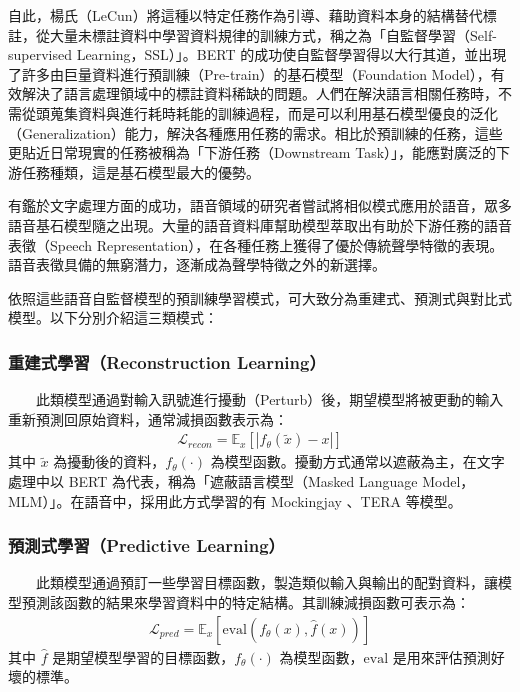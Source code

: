         自此，楊氏（LeCun）將這種以特定任務作為引導、藉助資料本身的結構替代標註，從大量未標註資料中學習資料規律的訓練方式，稱之為「自監督學習（Self-supervised Learning，SSL）」。BERT 的成功使自監督學習得以大行其道，並出現了許多由巨量資料進行預訓練（Pre-train）的基石模型（Foundation Model），有效解決了語言處理領域中的標註資料稀缺的問題。人們在解決語言相關任務時，不需從頭蒐集資料與進行耗時耗能的訓練過程，而是可以利用基石模型優良的泛化（Generalization）能力，解決各種應用任務的需求。相比於預訓練的任務，這些更貼近日常現實的任務被稱為「下游任務（Downstream Task）」，能應對廣泛的下游任務種類，這是基石模型最大的優勢。

        有鑑於文字處理方面的成功，語音領域的研究者嘗試將相似模式應用於語音，眾多語音基石模型隨之出現。大量的語音資料庫幫助模型萃取出有助於下游任務的語音表徵（Speech Representation），在各種任務上獲得了優於傳統聲學特徵的表現。語音表徵具備的無窮潛力，逐漸成為聲學特徵之外的新選擇。

        依照這些語音自監督模型的預訓練學習模式，可大致分為重建式、預測式與對比式模型。以下分別介紹這三類模式：

\subsubsection{重建式學習（Reconstruction Learning）}

　　此類模型通過對輸入訊號進行擾動（Perturb）後，期望模型將被更動的輸入重新預測回原始資料，通常減損函數表示為：
\begin{align}
    \mathcal{L}_{recon} = \mathbb{E}_x[|f_\theta(\tilde{x}) - x|]
\end{align}
其中 $\tilde{x}$ 為擾動後的資料，$f_\theta(\cdot)$ 為模型函數。擾動方式通常以遮蔽為主，在文字處理中以 BERT 為代表，稱為「遮蔽語言模型（Masked Language Model，MLM）」。在語音中，採用此方式學習的有 Mockingjay \cite{liu_mockingjay_2019}、TERA \cite{t_tera_2021} 等模型。  %

\subsubsection{預測式學習（Predictive Learning）}

　　此類模型通過預訂一些學習目標函數，製造類似輸入與輸出的配對資料，讓模型預測該函數的結果來學習資料中的特定結構。其訓練減損函數可表示為：
\begin{align}
    \mathcal{L}_{pred} = \mathbb{E}_x[\text{eval}(f_\theta(x), \hat{f}(x))]
\end{align}
其中 $\hat{f}$ 是期望模型學習的目標函數，$f_\theta(\cdot)$ 為模型函數，$\text{eval}$ 是用來評估預測好壞的標準。

